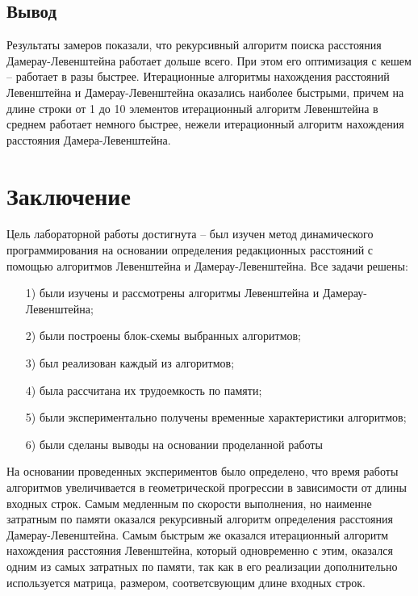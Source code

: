 \documentclass[12pt]{report}
\begin{document}
	\section*{Вывод}
	
	Результаты замеров показали, что рекурсивный алгоритм поиска расстояния Дамерау-Левенштейна работает дольше всего. При этом его оптимизация с кешем -- работает в разы быстрее. Итерационные алгоритмы нахождения расстояний Левенштейна и Дамерау-Левенштейна оказались наиболее быстрыми, причем на длине строки от 1 до 10 элементов итерационный алгоритм Левенштейна в среднем работает немного быстрее, нежели итерационный алгоритм нахождения расстояния Дамера-Левенштейна. 
	
	\chapter*{Заключение}
	
	Цель лабораторной работы достигнута -- был изучен метод динамического программирования на основании определения редакционных расстояний с помощью алгоритмов Левенштейна и Дамерау-Левенштейна. Все задачи решены:
	
	\begin{enumerate}
		\item[1)] были изучены и рассмотрены алгоритмы Левенштейна и Дамерау-Левенштейна;
		\item[2)] были построены блок-схемы выбранных алгоритмов;
		\item[3)] был реализован каждый из алгоритмов;
		\item[4)] была рассчитана их трудоемкость по памяти;
		\item[5)] были экспериментально получены временные характеристики алгоритмов;
		\item[6)] были сделаны выводы на основании проделанной работы
	\end{enumerate}
	
	На основании проведенных экспериментов было определено, что время работы алгоритмов увеличивается в геометрической прогрессии в зависимости от длины входных строк. Самым медленным по скорости выполнения, но наименне затратным по памяти оказался рекурсивный алгоритм определения расстояния Дамерау-Левенштейна. Самым быстрым же оказался итерационный алгоритм нахождения расстояния Левенштейна, который одновременно с этим, оказался одним из самых затратных по памяти, так как в его реализации дополнительно используется матрица, размером, соответсвующим длине входных строк.
	

\nocite{*} 

\renewcommand\bibname{Список использованных источников} %
	
\end{document}
